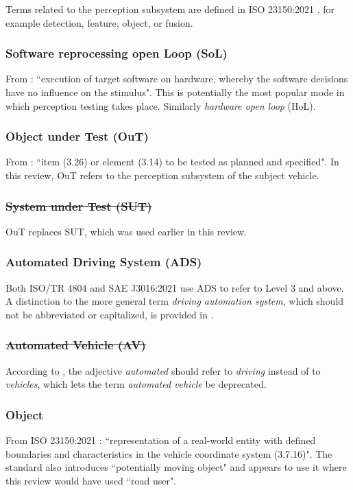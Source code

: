 \documentclass[conference]{IEEEtran}
\begin{document}
Terms related to the perception subsystem are defined in ISO 23150:2021 \cite{ISO_23150_2021_data_communication}, for example detection, feature, object, or fusion. 

\subsubsection{Software reprocessing open Loop (SoL)}
From \cite{ISO_TR_4804_2020}: ``execution of target software on hardware, whereby the software decisions have no influence on the stimulus". 
This is potentially the most popular mode in which perception testing takes place.
Similarly \textit{hardware open loop} (HoL). 


\subsubsection{Object under Test (OuT)}
From \cite{ISO_TR_4804_2020}: ``item (3.26) or element (3.14) to be tested as planned and specified". In this review, OuT refers to the perception subsystem of the subject vehicle.

\subsubsection{\sout{System under Test (SUT)}} OuT replaces SUT, which was used earlier in this review.

\subsubsection{Automated Driving System (ADS)}
Both ISO/TR 4804 \cite{ISO_TR_4804_2020} and SAE J3016:2021 \cite{sae2021j3016} use ADS to refer to Level 3 and above. 
A distinction to the more general term \textit{driving automation system}, which should not be abbreviated or capitalized, is provided in \cite{sae2021j3016}. 

\subsubsection{\sout{Automated Vehicle (AV)}} According to \cite{sae2021j3016}, the adjective \textit{automated} should refer to \textit{driving} instead of to \textit{vehicles}, which lets the term \textit{automated vehicle} be deprecated.

\subsubsection{Object} 
From ISO 23150:2021 \cite{ISO_23150_2021_data_communication}: 
``representation of a real-world entity with defined boundaries and characteristics in the vehicle coordinate system (3.7.16)".
The standard also introduces ``potentially moving object" and appears to use it where this review would have used ``road user". 
\end{document}
